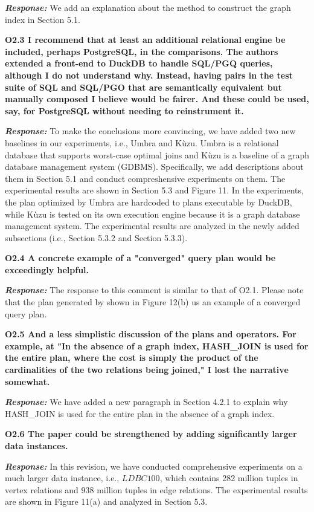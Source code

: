 \textbf{\textit{Response: }}
We add an explanation about the method to construct the graph index in Section 5.1.

\textbf{
O2.3 I recommend that at least an additional relational engine be included, perhaps PostgreSQL, in the comparisons. The authors extended a front-end to DuckDB to handle SQL/PGQ queries, although I do not understand why. Instead, having pairs in the test suite of SQL and SQL/PGO that are semantically equivalent but manually composed I believe would be fairer. And these could be used, say, for PostgreSQL without needing to reinstrument it.}

\textbf{\textit{Response: }}
To make the conclusions more convincing, we have added two new baselines in our experiments, i.e., Umbra and K\`uzu.
Umbra is a relational database that supports worst-case optimal joins and K\`uzu is a baseline of a graph database management system (GDBMS).
Specifically, we add descriptions about them in Section 5.1 and conduct compreshensive experiments on them.
The experimental results are shown in Section 5.3 and Figure 11.
In the experiments, the plan optimized by Umbra are hardcoded to plans executable by DuckDB, while K\`uzu is tested on its own execution engine because it is a graph database management system.
The experimental results are analyzed in the newly added subsections (i.e., Section 5.3.2 and Section 5.3.3).


\textbf{
O2.4 A concrete example of a "converged" query plan would be exceedingly helpful.}

\textbf{\textit{Response: }}
The response to this comment is similar to that of O2.1.
Please note that the plan generated by \name shown in Figure 12(b) us an example of a converged query plan.

\textbf{
O2.5 And a less simplistic discussion of the plans and operators. For example, at "In the absence of a graph index, HASH\_JOIN is used for the entire plan, where the cost is simply the product of the cardinalities of the two relations being joined," I lost the narrative somewhat. }

\textbf{\textit{Response: }}
We have added a new paragraph in Section 4.2.1 to explain why HASH\_JOIN is used for the entire plan in the absence of a graph index.


\textbf{
O2.6 The paper could be strengthened by adding significantly larger data instances.}

\textbf{\textit{Response: }}
In this revision, we have conducted comprehensive experiments on a much larger data instance, i.e., $LDBC100$, which contains 282 million tuples in vertex relations and 938 million tuples in edge relations.
The experimental results are shown in Figure 11(a) and analyzed in Section 5.3.


